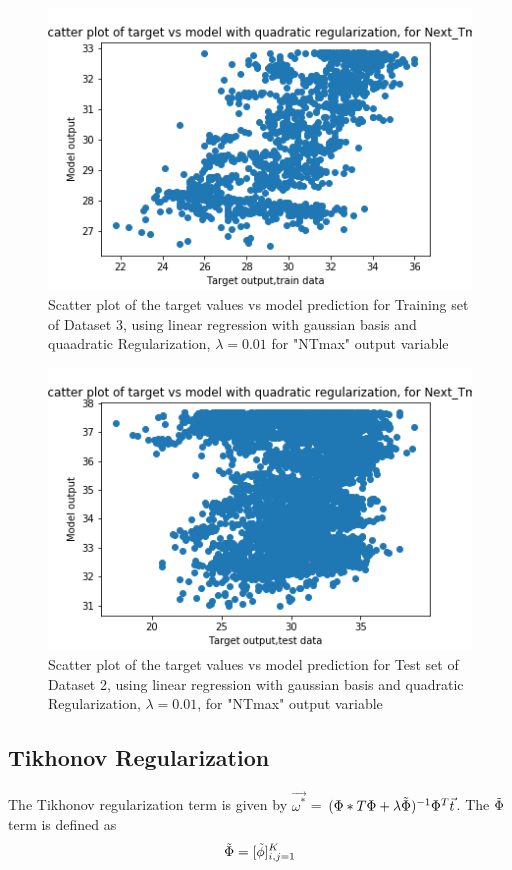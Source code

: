 \documentclass[12pt,a4paper]{article}
\begin{document}
\begin{figure}[H]
     \centering
     \includegraphics[scale=0.5]{images/scatter_ds3quadtrainT_max.png}
     \caption{Scatter plot of the target values vs model prediction for Training set of Dataset 3, using linear regression with gaussian basis and quaadratic Regularization, $\lambda = 0.01 $ for "NTmax" output variable}
\end{figure}
\begin{figure}[H]
     \centering
     \includegraphics[scale=0.5]{images/scatter_ds3quadtestT_max.png}
     \caption{Scatter plot of the target values vs model prediction for Test set of Dataset 2, using linear regression with gaussian basis and quadratic Regularization, $\lambda = 0.01$, for "NTmax" output variable}
\end{figure}

\subsection{Tikhonov Regularization} 
The Tikhonov regularization term is given by $\vec{\omega^*}$ = $(\Phi*T\Phi + \lambda \Tilde{\Phi})^{-1} \Phi^T \vec{t}$. The $\Tilde{\Phi}$ term is defined as 
\begin{equation}
    \Tilde{\Phi} = [\Tilde{\phi}]_{i,j = 1}^{K}
\end{equation}
\end{document}
